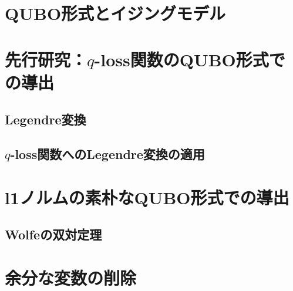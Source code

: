 \documentclass[paper]{ieicej}
\begin{document}
\section{QUBO形式とイジングモデル}
\section{先行研究：$q$-loss関数のQUBO形式での導出}
\subsection{Legendre変換}
\subsection{$q$-loss関数へのLegendre変換の適用}
\section{l1ノルムの素朴なQUBO形式での導出}
\subsection{Wolfeの双対定理}
\section{余分な変数の削除}


\ack %

%
%
\begin{thebibliography}{99}%
\bibitem{}
\end{thebibliography}

\appendix
\section{}

\begin{biography}
\end{biography}
\end{document}

